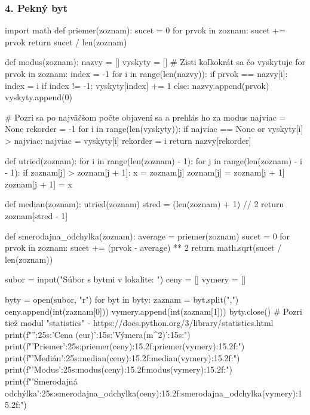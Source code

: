 \subsubsection*{4. Pekný byt}
\begin{solution}
import math
def priemer(zoznam):
    sucet = 0
    for prvok in zoznam:
        sucet += prvok
    return sucet / len(zoznam)

def modus(zoznam):
    nazvy = []
    vyskyty = []
    # Zisti koľkokrát sa čo vyskytuje
    for prvok in zoznam:
        index = -1
        for i in range(len(nazvy)):
            if prvok == nazvy[i]:
                index = i
        if index != -1:
            vyskyty[index] += 1
        else:
            nazvy.append(prvok)
            vyskyty.append(0)

    # Pozri sa po najväčšom počte objavení sa a prehlás ho za modus
    najviac = None
    rekorder = -1
    for i in range(len(vyskyty)):
        if najviac == None or vyskyty[i] > najviac:
            najviac = vyskyty[i]
            rekorder = i
    return nazvy[rekorder]

def utried(zoznam):
    for i in range(len(zoznam) - 1):
        for j in range(len(zoznam) - i - 1):
            if zoznam[j] > zoznam[j + 1]:
                x = zoznam[j]
                zoznam[j] = zoznam[j + 1]
                zoznam[j + 1] = x

def median(zoznam):
    utried(zoznam)
    stred = (len(zoznam) + 1) // 2
    return zoznam[stred - 1]

def smerodajna_odchylka(zoznam):
    average = priemer(zoznam)
    sucet = 0
    for prvok in zoznam:
        sucet += (prvok - average) ** 2
    return math.sqrt(sucet / len(zoznam))

subor = input("Súbor s bytmi v lokalite: ")
ceny = []
vymery = []

byty = open(subor, "r")
for byt in byty:
    zaznam = byt.split(",")
    ceny.append(int(zaznam[0]))
    vymery.append(int(zaznam[1]))
byty.close()
# Pozri tiež modul "statistics" - https://docs.python.org/3/library/statistics.html
print(f"{'':25s}:{'Cena (eur)':15s}:{'Výmera(m^2)':15s}:")
print(f"{'Priemer':25s}:{priemer(ceny):15.2f}:{priemer(vymery):15.2f}:")
print(f"{'Medián':25s}:{median(ceny):15.2f}:{median(vymery):15.2f}:")
print(f"{'Modus':25s}:{modus(ceny):15.2f}:{modus(vymery):15.2f}:")
print(f"{'Smerodajná odchýlka':25s}:{smerodajna_odchylka(ceny):15.2f}:{smerodajna_odchylka(vymery):15.2f}:")
\end{solution}

